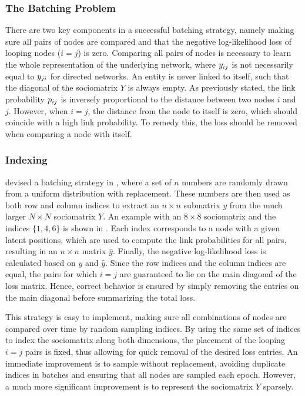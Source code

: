     \subsubsection{The Batching Problem}
    
        There are two key components in a successful batching strategy, namely making sure all pairs of nodes are compared and that the negative log-likelihood loss of looping nodes ($i=j$) is zero. 
        Comparing all pairs of nodes is necessary to learn the whole representation of the underlying network, where $\sub(y)$ is not necessarily equal to $\sub(y)(ji)$ for directed networks. 
        An entity is never linked to itself, such that the diagonal of the sociomatrix $Y$ is always empty. As previously stated, the link probability $\sub(p)$ is inversely proportional to the distance between two nodes $i$ and $j$. However, when $i=j$, the distance from the node to itself is zero, which should coincide with a high link probability. To remedy this, the loss should be removed when comparing a node with itself.
        
    \subsubsection{Indexing}
    
        \citeauthor{jacobsen2018a} devised a batching strategy in \cite{jacobsen2018a}, where a set of $n$ numbers are randomly drawn from a uniform distribution with replacement. These numbers are then used as both row and column indices to extract an $n\times n$ submatrix $y$ from the much larger $N\times N$ sociomatrix $Y$. An example with an $8\times 8$ sociomatrix and the indices $\{1,4,6\}$ is shown in . Each index corresponds to a node with a given latent positions, which are used to compute the link probabilities for all pairs, resulting in an $n\times n$ matrix $\hat{y}$. Finally, the negative log-likelihood loss is calculated based on $y$ and $\hat{y}$. Since the row indices and the column indices are equal, the pairs for which $i=j$ are guaranteed to lie on the main diagonal of the loss matrix. Hence, correct behavior is ensured by simply removing the entries on the main diagonal before summarizing the total loss. 
        
        This strategy is easy to implement, making sure all combinations of nodes are compared over time by random sampling indices. By using the same set of indices to index the sociomatrix along both dimensions, the placement of the looping $i=j$ pairs is fixed, thus allowing for quick removal of the desired loss entries.
        An immediate improvement is to sample without replacement, avoiding duplicate indices in batches and ensuring that all nodes are sampled each epoch. However, a much more significant improvement is to represent the sociomatrix $Y$ sparsely.
        
